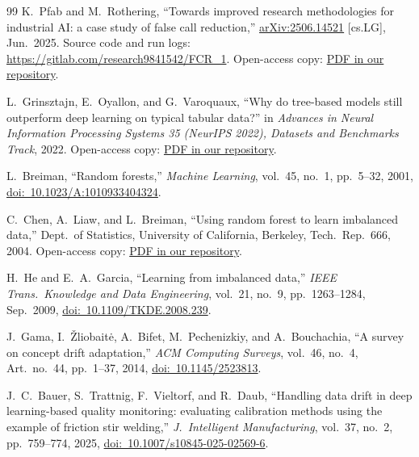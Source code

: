 \documentclass[11pt,a4paper]{article}
\begin{document}
\begin{thebibliography}{99}
K.~Pfab and M.~Rothering, ``Towards improved research methodologies for industrial AI: a case study of false call reduction,'' \href{https://arxiv.org/abs/2506.14521}{arXiv:2506.14521} [cs.LG], Jun.~2025. Source code and run logs: \url{https://gitlab.com/research9841542/FCR_1}. Open-access copy: \href{https://github.com/bodhi584/aoi-false-call-classification/blob/main/docs/papers/07_pfab_rothering_2025_arxiv.pdf}{PDF in our repository}.

L.~Grinsztajn, E.~Oyallon, and G.~Varoquaux, ``Why do tree-based models still outperform deep learning on typical tabular data?'' in \textit{Advances in Neural Information Processing Systems 35 (NeurIPS 2022), Datasets and Benchmarks Track}, 2022. Open-access copy: \href{https://github.com/bodhi584/aoi-false-call-classification/blob/main/docs/papers/08_grinsztajn_2022_neurips.pdf}{PDF in our repository}.

L.~Breiman, ``Random forests,'' \textit{Machine Learning}, vol.~45, no.~1, pp.~5--32, 2001, \href{https://doi.org/10.1023/A:1010933404324}{doi:~10.1023/A:1010933404324}.

C.~Chen, A.~Liaw, and L.~Breiman, ``Using random forest to learn imbalanced data,'' Dept.\ of Statistics, University of California, Berkeley, Tech.\ Rep.~666, 2004. Open-access copy: \href{https://github.com/bodhi584/aoi-false-call-classification/blob/main/docs/papers/10_chen_liaw_breiman_2004_techreport.pdf}{PDF in our repository}.

H.~He and E.~A.~Garcia, ``Learning from imbalanced data,'' \textit{IEEE Trans.\ Knowledge and Data Engineering}, vol.~21, no.~9, pp.~1263--1284, Sep.~2009, \href{https://doi.org/10.1109/TKDE.2008.239}{doi:~10.1109/TKDE.2008.239}.

J.~Gama, I.~\v{Z}liobait\.{e}, A.~Bifet, M.~Pechenizkiy, and A.~Bouchachia, ``A survey on concept drift adaptation,'' \textit{ACM Computing Surveys}, vol.~46, no.~4, Art.~no.~44, pp.~1--37, 2014, \href{https://doi.org/10.1145/2523813}{doi:~10.1145/2523813}.

J.~C.~Bauer, S.~Trattnig, F.~Vieltorf, and R.~Daub, ``Handling data drift in deep learning-based quality monitoring: evaluating calibration methods using the example of friction stir welding,'' \textit{J.\ Intelligent Manufacturing}, vol.~37, no.~2, pp.~759--774, 2025, \href{https://doi.org/10.1007/s10845-025-02569-6}{doi:~10.1007/s10845-025-02569-6}.


\end{thebibliography}
\end{document}

